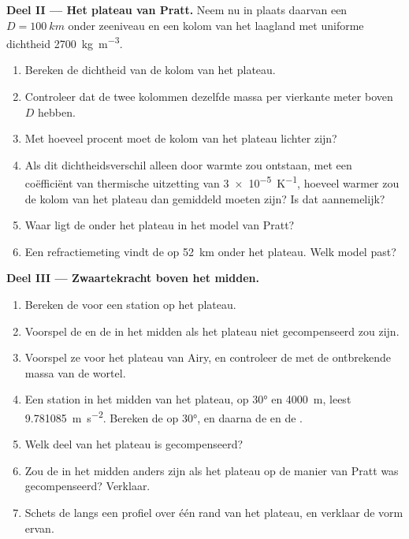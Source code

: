 \begin{problem}
\noindent\textbf{Deel II --- Het plateau van Pratt.}
Neem nu in plaats daarvan een  $D = \qty{100}{km}$ onder zeeniveau en een kolom van het laagland met uniforme dichtheid \qty{2700}{kg.m^{-3}}.
\begin{enumerate}[resume]
  \item Bereken de dichtheid van de kolom van het plateau.
  \item Controleer dat de twee kolommen dezelfde massa per vierkante meter boven $D$ hebben.
  \item Met hoeveel procent moet de kolom van het plateau lichter zijn?
  \item Als dit dichtheidsverschil alleen door warmte zou ontstaan, met een coëfficiënt van thermische uitzetting van \qty{3e-5}{K^{-1}}, hoeveel warmer zou de kolom van het plateau dan gemiddeld moeten zijn? Is dat aannemelijk?
  \item Waar ligt de  onder het plateau in het model van Pratt?
  \item Een refractiemeting vindt de  op \qty{52}{km} onder het plateau. Welk model past?
\end{enumerate}

\noindent\textbf{Deel III --- Zwaartekracht boven het midden.}
\begin{enumerate}[resume]
  \item Bereken de  voor een station op het plateau.
  \item Voorspel de  en de  in het midden als het plateau niet gecompenseerd zou zijn.
  \item Voorspel ze voor het plateau van Airy, en controleer de  met de ontbrekende massa van de wortel.
  \item Een station in het midden van het plateau, op  \ang{30} en \qty{4000}{m}, leest \qty{9.781085}{m.s^{-2}}. Bereken de  op \ang{30}, en daarna de  en de .
  \item Welk deel van het plateau is gecompenseerd?
  \item Zou de  in het midden anders zijn als het plateau op de manier van Pratt was gecompenseerd? Verklaar.
  \item Schets de  langs een profiel over één rand van het plateau, en verklaar de vorm ervan.
\end{enumerate}


\end{problem}
